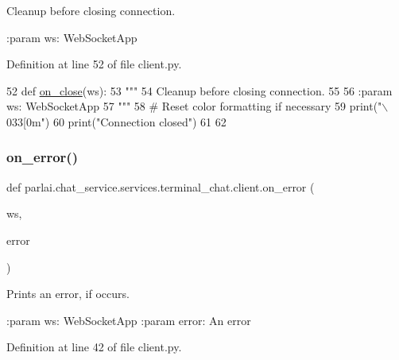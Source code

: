 \begin{DoxyVerb}Cleanup before closing connection.

:param ws: WebSocketApp
\end{DoxyVerb}
 

Definition at line 52 of file client.\+py.


\begin{DoxyCode}
52 \textcolor{keyword}{def }\hyperlink{namespaceparlai_1_1chat__service_1_1services_1_1terminal__chat_1_1client_a02c04f40cfa11defbf5c83bbe46aba00}{on\_close}(ws):
53     \textcolor{stringliteral}{"""}
54 \textcolor{stringliteral}{    Cleanup before closing connection.}
55 \textcolor{stringliteral}{}
56 \textcolor{stringliteral}{    :param ws: WebSocketApp}
57 \textcolor{stringliteral}{    """}
58     \textcolor{comment}{# Reset color formatting if necessary}
59     print(\textcolor{stringliteral}{"\(\backslash\)033[0m"})
60     print(\textcolor{stringliteral}{"Connection closed"})
61 
62 
\end{DoxyCode}
\mbox{\label{namespaceparlai_1_1chat__service_1_1services_1_1terminal__chat_1_1client_a261a307d930994b292f713c0fafbb575}} 
\subsubsection{\texorpdfstring{on\+\_\+error()}{on\_error()}}
{\footnotesize\ttfamily def parlai.\+chat\+\_\+service.\+services.\+terminal\+\_\+chat.\+client.\+on\+\_\+error (\begin{DoxyParamCaption}\item[{}]{ws,  }\item[{}]{error }\end{DoxyParamCaption})}

\begin{DoxyVerb}Prints an error, if occurs.

:param ws: WebSocketApp
:param error: An error
\end{DoxyVerb}
 

Definition at line 42 of file client.\+py.


